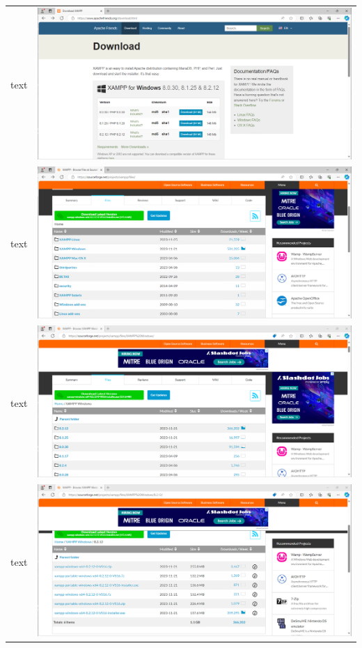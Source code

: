 \documentclass[11pt]{report}
\begin{document}
        \begin{tabular}{ l r }
            text & \includegraphics[scale=1.0]{xampp01} \\ %
            text & \includegraphics[scale=1.0]{xampp02} \\
            text & \includegraphics[scale=1.0]{xampp03} \\
            text & \includegraphics[scale=1.0]{xampp04} \\

\end{tabular}
\end{document}
